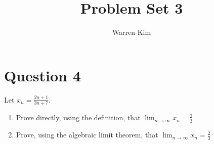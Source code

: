 \documentclass[13pt]{article}
\title{Problem Set 3}
\author{Warren Kim}
\begin{document}
\maketitle

\newpage
\section*{Question 4}
Let $x_n = \frac{2n + 1}{3n + 7}$.
\begin{enumerate}[label=(\alph*)]
\item Prove directly, using the definition, that $\lim_{n \rightarrow
    \infty}x_n = \frac{2}{3}$ 
\item Prove, using the algebraic limit theorem, that $\lim_{n
    \rightarrow \infty}x_n = \frac{2}{3}$ 
\end{enumerate}
\end{document}
